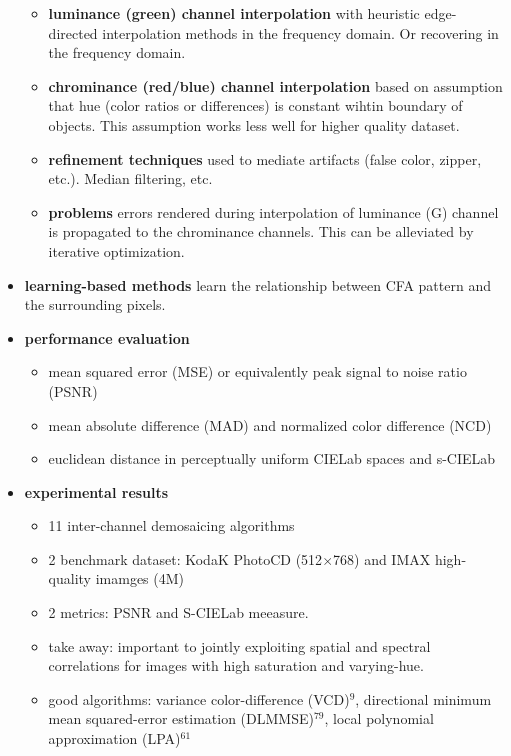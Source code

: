 \documentclass[11pt]{article}
\begin{document}
\begin{itemize}
\begin{itemize}
        \item \textbf{luminance (green) channel interpolation} with heuristic edge-directed interpolation methods in the frequency domain. Or recovering in the frequency domain.
        \item \textbf{chrominance (red/blue) channel interpolation} based on assumption that hue (color ratios or differences) is constant wihtin boundary of objects. This assumption works less well for higher quality dataset. 
        \item \textbf{refinement techniques} used to mediate artifacts (false color, zipper, etc.). Median filtering, etc.
        \item \textbf{problems} errors rendered during interpolation of luminance (G) channel is propagated to the chrominance channels. This can be alleviated by iterative optimization.
    \end{itemize}
    \item \textbf{learning-based methods} learn the relationship between CFA pattern and the surrounding pixels.
    \item \textbf{performance evaluation}
    \begin{itemize}
        \item mean squared error (MSE) or equivalently peak signal to noise ratio (PSNR) 
        \item mean absolute difference (MAD) and normalized color difference (NCD)
        \item euclidean distance in perceptually uniform CIELab spaces and s-CIELab
    \end{itemize}
    \item \textbf{experimental results}
    \begin{itemize}
        \item 11 inter-channel demosaicing algorithms
        \item 2 benchmark dataset: KodaK PhotoCD (512$\times$768) and IMAX high-quality imamges (4M)
        \item 2 metrics: PSNR and S-CIELab meeasure.
        \item take away: important to jointly exploiting spatial and spectral correlations for images with high saturation and varying-hue.
        \item good algorithms: variance color-difference (VCD)$^9$, directional minimum mean squared-error estimation (DLMMSE)$^{79}$, local polynomial approximation (LPA)$^{61}$
    \end{itemize}
\end{itemize}
 
\end{document}
